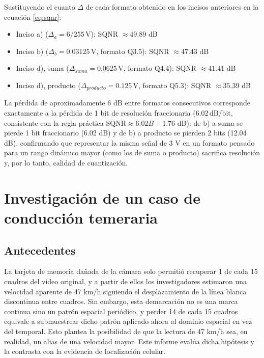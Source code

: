 \documentclass[conference]{IEEEtran}
\begin{document}
Sustituyendo el cuanto $\Delta$ de cada formato obtenido en los incisos anteriores en la ecuación \eqref{eq:sqnr}:

\begin{itemize}
\item Inciso a) ($\Delta_a = 6/255\,\text{V}$): SQNR $\approx 49.89$ dB
\item Inciso b) ($\Delta_b = 0.03125\,\text{V}$, formato Q3.5): SQNR $\approx 47.43$ dB
\item Inciso d), suma ($\Delta_{suma} = 0.0625\,\text{V}$, formato Q4.4): SQNR $\approx 41.41$ dB
\item Inciso d), producto ($\Delta_{producto} = 0.125\,\text{V}$, formato Q5.3): SQNR $\approx 35.39$ dB
\end{itemize}

La pérdida de aproximadamente 6 dB entre formatos consecutivos corresponde exactamente a la pérdida de 1 bit de resolución fraccionaria ($6.02\,\text{dB/bit}$, consistente con la regla práctica $\text{SQNR}\approx6.02B+1.76$ dB): de b) a suma se pierde 1 bit fraccionario (6.02 dB) y de b) a producto se pierden 2 bits (12.04 dB), confirmando que representar la misma señal de 3 V en un formato pensado para un rango dinámico mayor (como los de suma o producto) sacrifica resolución y, por lo tanto, calidad de cuantización.



\section{Investigación de un caso de conducción temeraria}

\subsection{Antecedentes}

La tarjeta de memoria dañada de la cámara solo permitió recuperar 1 de cada 15 cuadros del video original, y a partir de ellos los investigadores estimaron una velocidad aparente de 47 km/h siguiendo el desplazamiento de la línea blanca discontinua entre cuadros. 
Sin embargo, esta demarcación no es una marca continua sino un patrón espacial periódico, y perder 14 de cada 15 cuadros equivale a submuestrear dicho patrón aplicado ahora al dominio espacial en vez del temporal. 
Esto plantea la posibilidad de que la lectura de 47 km/h sea, en realidad, un alias de una velocidad mayor. 
Este informe evalúa dicha hipótesis y la contrasta con la evidencia de localización celular.
\end{document}
